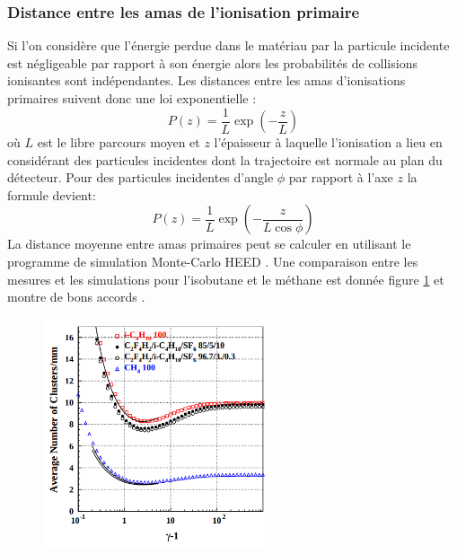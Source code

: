 \subsubsection{Distance entre les amas de l'ionisation primaire}
Si l'on considère que l'énergie perdue dans le matériau par la particule incidente est négligeable par rapport à son énergie alors les probabilités de collisions ionisantes sont indépendantes. Les distances entre les amas d'ionisations primaires suivent donc une loi exponentielle :
\begin{equation}
P(z)=\frac{1}{L}\exp\left(-\frac{z}{L}\right)
\end{equation} 
où $L$ est le libre parcours moyen et $z$ l'épaisseur à laquelle l'ionisation a lieu en considérant des particules incidentes dont la trajectoire est normale au plan du détecteur. Pour des particules incidentes d'angle $\phi$ par rapport à l'axe $z$ la formule devient:
\begin{equation}
P(z)=\frac{1}{L}\exp\left(-\frac{z}{L\cos\phi}\right)
\end{equation}
La distance moyenne entre amas primaires peut se calculer en utilisant le programme de simulation Monte-Carlo HEED \cite{HEED}. Une comparaison entre les mesures et les simulations pour l'isobutane et le méthane est donnée figure \ref{lambda} et montre de bons accords \cite{2004NIMPA}.  

\begin{figure}[ht!]
	\centering
	\includegraphics[width=0.60\textwidth]{RPC/lambda.png}
	\label{lambda}
\end{figure}

